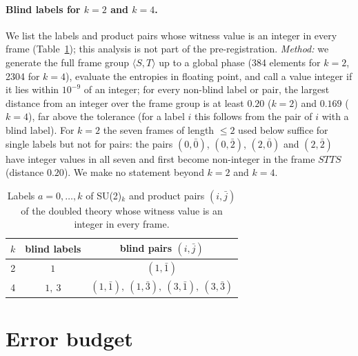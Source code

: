 \documentclass[aps,pra,reprint,superscriptaddress,nofootinbib]{revtex4-2}
\begin{document}
\newif\ifblindtable
\blindtabletrue
\ifblindtable
\paragraph*{Blind labels for $k=2$ and $k=4$.}
We list the labels and product pairs whose witness value is an integer in every frame (Table~\ref{tab:blind}); this analysis is not part of the pre-registration.
\emph{Method:} we generate the full frame group $\langle S,T\rangle$ up to a global phase (384 elements for $k=2$, 2304 for $k=4$), evaluate the entropies in floating point, and call a value integer if it lies within $10^{-9}$ of an integer; for every non-blind label or pair, the largest distance from an integer over the frame group is at least $0.20$ ($k=2$) and $0.169$ ($k=4$), far above the tolerance (for a label $i$ this follows from the pair of $i$ with a blind label).
For $k=2$ the seven frames of length $\le2$ used below suffice for single labels but not for pairs: the pairs $(0,\bar0)$, $(0,\bar2)$, $(2,\bar0)$ and $(2,\bar2)$ have integer values in all seven and first become non-integer in the frame $STTS$ (distance $0.20$).
We make no statement beyond $k=2$ and $k=4$.
\begin{table}[b]
\caption{\label{tab:blind}Labels $a=0,\dots,k$ of SU(2)$_k$ and product pairs $(i,\bar j)$ of the doubled theory whose witness value is an integer in every frame.}
\begin{ruledtabular}
\begin{tabular}{ccc}
$k$ & blind labels & blind pairs $(i,\bar j)$\\
\hline
2 & $1$ & $(1,\bar1)$\\
4 & $1,\ 3$ & $(1,\bar1),\ (1,\bar3),\ (3,\bar1),\ (3,\bar3)$\\
\end{tabular}
\end{ruledtabular}
\end{table}
\fi

\section{Error budget}\label{sec:budget}
\end{document}
